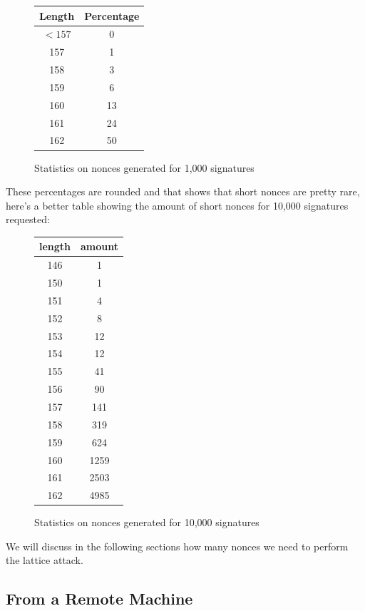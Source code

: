 \documentclass[a4paper,11pt]{article}
\begin{document}
\begin{figure}[H]
\begin{center} 
\begin{tabular}{@{} *2c @{}}
\toprule
 Length & Percentage \\ 
\midrule
$<157$&     0          \\
157&     1          \\
158&     3          \\
159&     6          \\
160&       13         \\
161&     24         \\
162&        50
\bottomrule
\end{tabular}
\end{center} 
\caption{Statistics on nonces generated for 1,000 signatures}
\end{figure}
These percentages are rounded and that shows that short nonces are pretty rare, here's a better table showing the amount of short nonces for 10,000 signatures requested:

\begin{figure}[H]
\begin{center} 
\begin{tabular}{@{} *2c @{}}
\toprule
length & amount \\ 
\midrule
146 &    1      \\
150&     1       \\
151 &    4       \\
152  &   8       \\
153   &  12      \\
154  &   12      \\
155 &    41      \\
156&     90      \\
157 &    141     \\
158 &    319     \\
159  &   624     \\
160   &  1259    \\
161    & 2503   \\ 
162     &4985    
\bottomrule
\end{tabular}
\end{center} 
\caption{Statistics on nonces generated for 10,000 signatures}
\end{figure}

We will discuss in the following sections how many nonces we need to perform the lattice attack.


\subsection{From a Remote Machine}
\end{document}
